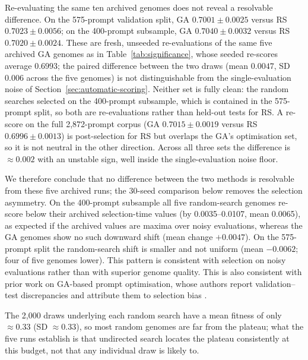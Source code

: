 \documentclass[mathematics,article,submit,xetex,moreauthors]{Definitions/mdpi}
\begin{document}
Re-evaluating the same ten archived genomes does not reveal a resolvable
difference. On the 575-prompt validation split, GA $0.7001 \pm 0.0025$ versus
RS $0.7023 \pm 0.0056$; on the 400-prompt subsample, GA $0.7040 \pm 0.0032$
versus RS $0.7020 \pm 0.0024$. These are fresh, unseeded re-evaluations of the same five archived GA
genomes as in Table~\ref{tab:significance}, whose seeded re-scores average
$0.6993$; the paired difference between the two draws (mean $0.0047$, SD
$0.006$ across the five genomes) is not distinguishable from the
single-evaluation noise of Section~\ref{sec:automatic-scoring}.
Neither set is fully clean: the random searches
selected on the 400-prompt subsample, which is contained in the 575-prompt
split, so both are re-evaluations rather than held-out tests for RS. A
re-score on the full 2,872-prompt corpus (GA $0.7015 \pm 0.0019$ versus RS
$0.6996 \pm 0.0013$) is post-selection for RS but overlaps the GA's
optimisation set, so it is not neutral in the other direction. Across all
three sets the difference is $\approx 0.002$ with an unstable sign, well
inside the single-evaluation noise floor.

We therefore conclude that no difference between the two methods is
resolvable from these five archived runs; the 30-seed comparison below removes
the selection asymmetry. On the 400-prompt subsample all five random-search genomes re-score below
their archived selection-time values (by 0.0035--0.0107, mean 0.0065), as
expected if the archived values are maxima over noisy evaluations, whereas the
GA genomes show no such downward shift (mean change $+0.0047$). On the
575-prompt split the random-search shift is smaller and not uniform (mean
$-0.0062$; four of five genomes lower). This pattern is consistent with
selection on noisy evaluations rather than with superior genome quality. This
is also consistent with prior work on GA-based prompt optimisation, whose authors
report validation--test discrepancies and attribute them to selection bias
\cite{gaapo2025}.

The 2,000 draws underlying each random search have a mean fitness of only
$\approx 0.33$ (SD $\approx 0.33$), so most random genomes are far from the
plateau; what the five runs establish is that undirected search locates the
plateau consistently at this budget, not that any individual draw is likely to.
\end{document}
